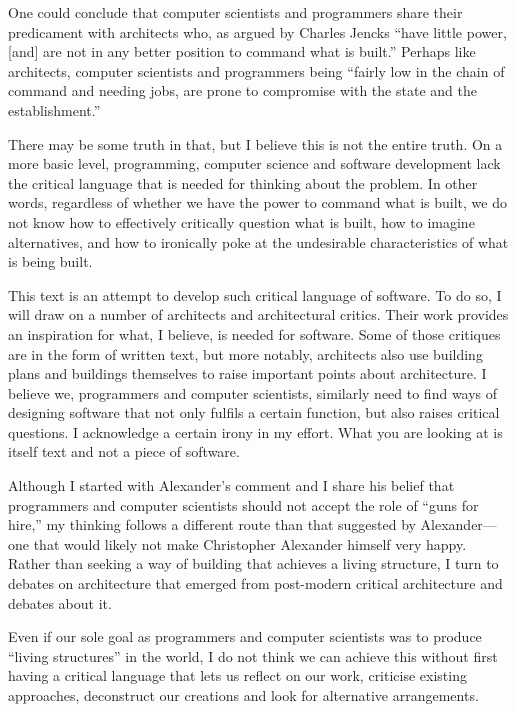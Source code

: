 One could conclude that computer scientists and programmers share their predicament with architects
who, as argued by Charles Jencks ``have little power, [and] are not in any better
position to command what is built.'' Perhaps like architects, computer scientists and programmers
being ``fairly low in the chain of command and needing jobs, are prone to compromise with the
state and the establishment.''

There may be some truth in that, but I believe this is not the entire truth. On a more basic level,
programming, computer science and software development lack the critical language that is needed
for thinking about the problem. In other words, regardless of whether we have the power to command
what is built, we do not know how to effectively critically question what is built, how to imagine
alternatives, and how to ironically poke at the undesirable characteristics of what is being built.

This text is an attempt to develop such critical language of software. To do so, I will draw on
a number of architects and architectural critics. Their work provides an inspiration for
what, I believe, is needed for software. Some of those critiques are in the form of written text,
but more notably, architects also use building plans and buildings themselves to raise important
points about architecture. I believe we, programmers and computer scientists, similarly need to
find ways of designing software that not only fulfils a certain function, but also raises critical
questions. I acknowledge a certain irony in my effort. What you are looking at is itself text
and not a piece of software.

Although I started with Alexander's comment and I share his belief that programmers and computer
scientists should not accept the role of ``guns for hire,'' my thinking follows a different
route than that suggested by Alexander---one that would likely not make Christopher Alexander
himself very happy.
Rather than seeking a way of building that achieves a living structure, I turn to debates
on architecture that emerged from post-modern critical architecture and debates about it.

Even if our sole goal as programmers and computer scientists was to produce ``living
structures'' in the world, I do not think we can achieve this without first having a critical
language that lets us reflect on our work, criticise existing approaches, deconstruct our creations
and look for alternative arrangements.

